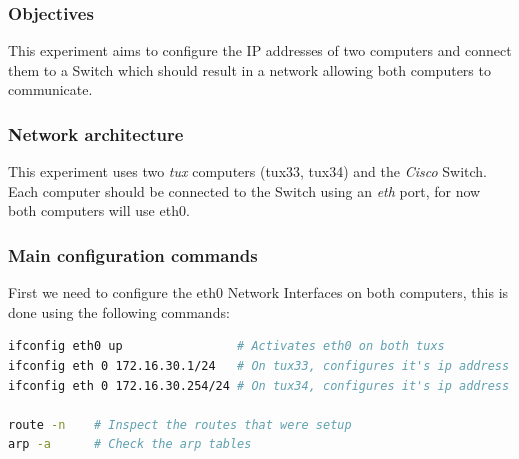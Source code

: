 \documentclass[a4paper,11pt,english]{article}
\begin{document}
        \subsubsection{Objectives}
            This experiment aims to configure the IP addresses of two computers and connect
            them to a Switch which should result in a network allowing both computers to
            communicate.

        \subsubsection{Network architecture}
            This experiment uses two \textit{tux} computers (tux33, tux34) and the 
            \textit{Cisco} Switch. Each computer should be connected to the Switch 
            using an \textit{eth} port, for now both computers will use eth0. 
            
        \subsubsection{Main configuration commands}
            First we need to configure the eth0 Network Interfaces on both computers, this
            is done using the following commands:

\begin{lstlisting}[language=sh]
ifconfig eth0 up                # Activates eth0 on both tuxs
ifconfig eth 0 172.16.30.1/24   # On tux33, configures it's ip address on eth0
ifconfig eth 0 172.16.30.254/24 # On tux34, configures it's ip address on eth0

route -n    # Inspect the routes that were setup
arp -a      # Check the arp tables
\end{lstlisting}
\end{document}
